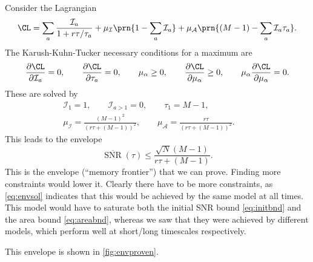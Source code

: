 \documentclass[12pt]{article}
\DeclareMathOperator{\snr}{SNR}
\newcommand{\snrb}{\overline{\snr}}
\newcommand{\CI}{\mathcal{I}}
\newcommand{\CA}{\mathcal{A}}
\renewcommand{\pdiff}[2]{\frac{\partial #1}{\partial #2}}
\begin{document}
Consider the Lagrangian
%
\begin{equation}\label{eq:envlagrangian}
  \CL = \sum_a \frac{\CI_a}{1+r\tau/\tau_a} + \mu_\CI \prn{1 - \sum_a \CI_a} + \mu_\CA \prn{(M-1) - \sum_a \CI_a \tau_a}.
\end{equation}
%
The Karush-Kuhn-Tucker necessary conditions for a maximum are
%
\begin{equation}\label{eq:envKTcond}
  \pdiff{\CL}{\CI_a} = 0, \qquad
  \pdiff{\CL}{\tau_a} = 0, \qquad
  \mu_\alpha \geq 0, \qquad
  \pdiff{\CL}{\mu_\alpha} \geq 0, \qquad
  \mu_\alpha\pdiff{\CL}{\mu_\alpha} = 0.
\end{equation}
%
These are solved by
%
\begin{equation}\label{eq:envsol}
\begin{gathered}
  \CI_1 = 1, \qquad
  \CI_{a>1} = 0, \qquad
  \tau_1 = M-1, \\
  \mu_\CI = \frac{(M-1)^2}{(r\tau + (M-1))^2}, \qquad
  \mu_\CA = \frac{r\tau}{(r\tau+(M-1))^2}. \qquad
\end{gathered}
\end{equation}
%
This leads to the envelope
%
\begin{equation}\label{eq:env}
  \snrb(\tau) \leq \frac{\sqrt{N}(M-1)}{r\tau + (M-1)}.
\end{equation}
%
This is the envelope (``memory frontier'') that we can prove.
Finding more constraints would lower it.
Clearly there have to be more constraints, as \eqref{eq:envsol} indicates that this would be achieved by the same model at all times.
This model would have to saturate both the initial SNR bound \eqref{eq:initbnd} and the area bound \eqref{eq:areabnd}, whereas we saw that they were achieved by different models, which perform well at short/long timescales respectively.

This envelope is shown in \autoref{fig:envproven}.
\end{document}
